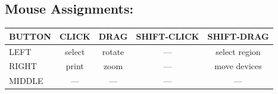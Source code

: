 \documentclass{article}
\begin{document}
\begin{appendix}
\section{Mouse Assignments:}

\begin{center}
\begin{tabular}{|l|cccc|}
\hline
BUTTON & CLICK & DRAG & SHIFT-CLICK & SHIFT-DRAG \\ \hline
LEFT   & select & rotate & --- & select region \\
RIGHT  & print & zoom & --- & move devices \\
MIDDLE & --- & --- & --- & --- \\
\hline
\end{tabular}
\end{center}

\end{appendix}
\end{document}
